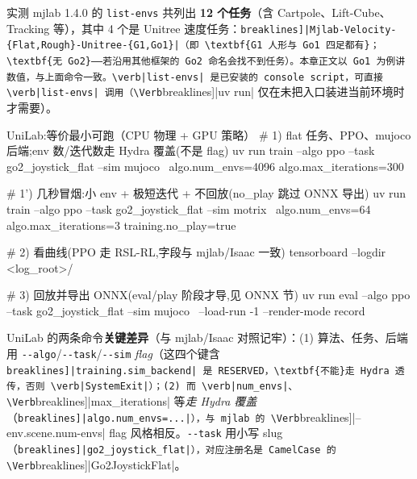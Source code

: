 \begin{note}
实测 mjlab 1.4.0 的 \verb|list-envs| 共列出 \textbf{12 个任务}（含 Cartpole、Lift-Cube、Tracking 等），其中 4 个是 Unitree 速度任务：\Verb[breaklines]|Mjlab-Velocity-{Flat,Rough}-Unitree-{G1,Go1}|（即 \textbf{G1 人形与 Go1 四足都有}；\textbf{无 Go2}——若沿用其他框架的 Go2 命名会找不到任务）。本章正文以 Go1 为例讲数值，与上面命令一致。\verb|list-envs| 是已安装的 console script，可直接 \verb|list-envs| 调用（\Verb[breaklines]|uv run| 仅在未把入口装进当前环境时才需要）。
\end{note}

\begin{codebox}[bash]{UniLab:等价最小可跑（CPU 物理 + GPU 策略）}
# 1) flat 任务、PPO、mujoco 后端;env 数/迭代数走 Hydra 覆盖(不是 flag)
uv run train --algo ppo --task go2_joystick_flat --sim mujoco \
    algo.num_envs=4096 algo.max_iterations=300

# 1') 几秒冒烟:小 env + 极短迭代 + 不回放(no_play 跳过 ONNX 导出)
uv run train --algo ppo --task go2_joystick_flat --sim motrix \
    algo.num_envs=64 algo.max_iterations=3 training.no_play=true

# 2) 看曲线(PPO 走 RSL-RL,字段与 mjlab/Isaac 一致)
tensorboard --logdir <log_root>/

# 3) 回放并导出 ONNX(eval/play 阶段才导,见 ONNX 节)
uv run eval --algo ppo --task go2_joystick_flat --sim mujoco \
    --load-run -1 --render-mode record
\end{codebox}

\begin{note}
UniLab 的两条命令\textbf{关键差异}（与 mjlab/Isaac 对照记牢）：(1) 算法、任务、后端用 \verb|--algo|/\allowbreak\verb|--task|/\allowbreak\verb|--sim| \emph{flag}（这四个键含 \Verb[breaklines]|training.sim_backend| 是 RESERVED，\textbf{不能}走 Hydra 透传，否则 \verb|SystemExit|）；(2) 而 \verb|num_envs|、\Verb[breaklines]|max_iterations| 等\emph{走 Hydra 覆盖}（\Verb[breaklines]|algo.num_envs=...|），与 mjlab 的 \Verb[breaklines]|--env.scene.num-envs| flag 风格相反。\verb|--task| 用小写 slug（\Verb[breaklines]|go2_joystick_flat|），对应注册名是 CamelCase 的 \Verb[breaklines]|Go2JoystickFlat|。
\end{note}

